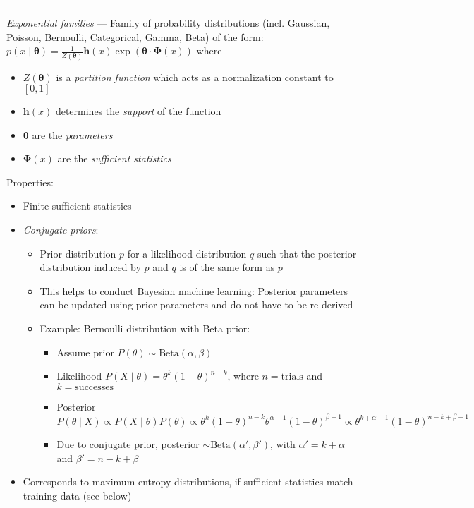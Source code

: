 {\color{lightgray}\hrule height 0.001mm}

\emph{Exponential families} ---  Family of probability distributions (incl. Gaussian, Poisson, Bernoulli, Categorical, Gamma, Beta) of the form: $ p(x \mid \boldsymbol{\theta}) = \frac{1}{Z(\boldsymbol{\theta})} \boldsymbol{h}(x) \exp\left(\boldsymbol{\theta} \cdot \boldsymbol{\Phi}(x)\right) $ where
\begin{itemize}
\item $Z(\boldsymbol{\theta})$ is a \emph{partition function} which acts as a normalization constant to $[0, 1]$
\item $\boldsymbol{h}(x)$ determines the \emph{support} of the function
\item $\boldsymbol{\theta}$ are the \emph{parameters}
\item $\boldsymbol{\Phi}(x)$ are the \emph{sufficient statistics}
\end{itemize}
Properties:
\begin{itemize}
    \item Finite sufficient statistics
    \item \emph{Conjugate priors}:
    \begin{itemize}
        \item Prior distribution $p$ for a likelihood distribution $q$ such that the posterior distribution induced by $p$ and $q$ is of the same form as $p$
        \item This helps to conduct Bayesian machine learning: Posterior parameters can be updated using prior parameters and do not have to be re-derived
        \item Example: Bernoulli distribution with Beta prior:
        \begin{itemize}
            \item Assume prior $P(\theta) \sim \textrm{Beta}(\alpha, \beta)$
            \item Likelihood $P(X \mid \theta) = \theta^k (1 - \theta)^{n-k}$, where $n = \textrm{trials}$ and $k = \textrm{successes}$
            \item Posterior $P(\theta \mid X) \propto P(X \mid \theta) P(\theta) \propto \theta^k (1 - \theta)^{n-k} \theta^{\alpha-1} (1 - \theta)^{\beta-1} \propto \theta^{k + \alpha - 1} (1 - \theta)^{n - k + \beta - 1}$
            \item Due to conjugate prior, posterior $\sim \textrm{Beta}(\alpha', \beta')$, with $\alpha' = k + \alpha$ and $\beta' = n - k + \beta$
        \end{itemize}
    \end{itemize}
    \item Corresponds to maximum entropy distributions, if sufficient statistics match training data (see below)
\end{itemize}
